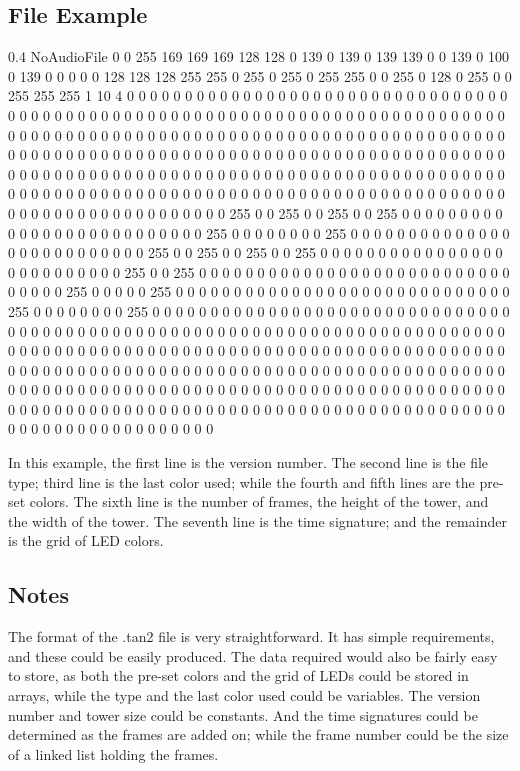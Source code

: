 \subsection{File Example}
0.4  
NoAudioFile
0 0 255 
169 169 169 128 128 0 139 0 139 0 139 139 0 0 139 0 100 0 139 0 0 0 0 0 128 128 128 255 255 0 255 0 255 0 255 255 0 0 255 0 128 0 255 0 0 255 255 255 
1 10 4 
0 
0 0 0 0 0 0 0 0 0 0 0 0 0 0 0 0 0 0 0 0 0 0 0 0 0 0 0 0 0 0 0 0 0 0 0 0 
0 0 0 0 0 0 0 0 0 0 0 0 0 0 0 0 0 0 0 0 0 0 0 0 0 0 0 0 0 0 0 0 0 0 0 0 
0 0 0 0 0 0 0 0 0 0 0 0 0 0 0 0 0 0 0 0 0 0 0 0 0 0 0 0 0 0 0 0 0 0 0 0 
0 0 0 0 0 0 0 0 0 0 0 0 0 0 0 0 0 0 0 0 0 0 0 0 0 0 0 0 0 0 0 0 0 0 0 0 
0 0 0 0 0 0 0 0 0 0 0 0 0 0 0 0 0 0 0 0 0 0 0 0 0 0 0 0 0 0 0 0 0 0 0 0 
0 0 0 0 0 0 0 0 0 0 0 0 0 0 0 0 0 0 0 0 0 0 0 0 0 0 0 0 0 0 0 0 0 0 0 0 
0 0 0 0 0 0 0 0 0 0 0 0 0 0 0 0 0 0 0 0 0 0 0 0 0 0 0 0 0 0 0 0 0 0 0 0 
0 0 0 0 0 0 0 0 0 0 0 0 0 0 255 0 0 255 0 0 255 0 0 255 0 0 0 0 0 0 0 0 0 0 0 0 
0 0 0 0 0 0 0 0 0 0 0 0 0 0 255 0 0 0 0 0 0 0 0 255 0 0 0 0 0 0 0 0 0 0 0 0 
0 0 0 0 0 0 0 0 0 0 0 0 0 0 255 0 0 255 0 0 255 0 0 255 0 0 0 0 0 0 0 0 0 0 0 0 
0 0 0 0 0 0 0 0 0 0 0 0 0 0 255 0 0 255 0 0 0 0 0 0 0 0 0 0 0 0 0 0 0 0 0 0 
0 0 0 0 0 0 0 0 0 0 0 0 0 0 255 0 0 0 0 0 255 0 0 0 0 0 0 0 0 0 0 0 0 0 0 0 
0 0 0 0 0 0 0 0 0 0 0 0 0 0 255 0 0 0 0 0 0 0 0 255 0 0 0 0 0 0 0 0 0 0 0 0 
0 0 0 0 0 0 0 0 0 0 0 0 0 0 0 0 0 0 0 0 0 0 0 0 0 0 0 0 0 0 0 0 0 0 0 0 
0 0 0 0 0 0 0 0 0 0 0 0 0 0 0 0 0 0 0 0 0 0 0 0 0 0 0 0 0 0 0 0 0 0 0 0 
0 0 0 0 0 0 0 0 0 0 0 0 0 0 0 0 0 0 0 0 0 0 0 0 0 0 0 0 0 0 0 0 0 0 0 0 
0 0 0 0 0 0 0 0 0 0 0 0 0 0 0 0 0 0 0 0 0 0 0 0 0 0 0 0 0 0 0 0 0 0 0 0 
0 0 0 0 0 0 0 0 0 0 0 0 0 0 0 0 0 0 0 0 0 0 0 0 0 0 0 0 0 0 0 0 0 0 0 0 
0 0 0 0 0 0 0 0 0 0 0 0 0 0 0 0 0 0 0 0 0 0 0 0 0 0 0 0 0 0 0 0 0 0 0 0 
0 0 0 0 0 0 0 0 0 0 0 0 0 0 0 0 0 0 0 0 0 0 0 0 0 0 0 0 0 0 0 0 0 0 0 0 

In this example, the first line is the version number.  The second line is the file type; third line is the last color used; while the fourth and fifth lines are the pre-set colors.  The sixth line is the number of frames, the height of the tower, and the width of the tower.  The seventh line is the time signature; and the remainder is the grid of LED colors.

\subsection{Notes}
The format of the .tan2 file is very straightforward.  It has simple requirements, and these could be easily produced.  The data required would also be fairly easy to store, as both the pre-set colors and the grid of LEDs could be stored in arrays, while the type and the last color used could be variables.  The version number and tower size could be constants.  And the time signatures could be determined as the frames are added on; while the frame number could be the size of a linked list holding the frames.  

